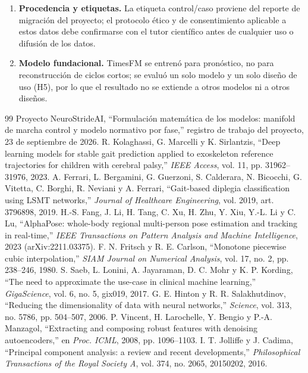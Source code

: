 \documentclass[11pt,a4paper]{article}
\begin{document}
\begin{enumerate}
\item \textbf{Procedencia y etiquetas.} La etiqueta control/caso proviene del reporte de migración del proyecto; el protocolo ético y de consentimiento aplicable a estos datos debe confirmarse con el tutor científico antes de cualquier uso o difusión de los datos.
\item \textbf{Modelo fundacional.} TimesFM se entrenó para pronóstico, no para reconstrucción de ciclos cortos; se evaluó un solo modelo y un solo diseño de uso (H5), por lo que el resultado no se extiende a otros modelos ni a otros diseños.
\end{enumerate}

\begin{thebibliography}{99}
\small
{} Proyecto NeuroStrideAI, ``Formulación matemática de los modelos: manifold de marcha control y modelo normativo por fase,'' registro de trabajo del proyecto, 23 de septiembre de 2026.
 R. Kolaghassi, G. Marcelli y K. Sirlantzis, ``Deep learning models for stable gait prediction applied to exoskeleton reference trajectories for children with cerebral palsy,'' \emph{IEEE Access}, vol. 11, pp. 31962--31976, 2023.
 A. Ferrari, L. Bergamini, G. Guerzoni, S. Calderara, N. Bicocchi, G. Vitetta, C. Borghi, R. Neviani y A. Ferrari, ``Gait-based diplegia classification using LSMT networks,'' \emph{Journal of Healthcare Engineering}, vol. 2019, art. 3796898, 2019.
 H.-S. Fang, J. Li, H. Tang, C. Xu, H. Zhu, Y. Xiu, Y.-L. Li y C. Lu, ``AlphaPose: whole-body regional multi-person pose estimation and tracking in real-time,'' \emph{IEEE Transactions on Pattern Analysis and Machine Intelligence}, 2023 (arXiv:2211.03375).
 F. N. Fritsch y R. E. Carlson, ``Monotone piecewise cubic interpolation,'' \emph{SIAM Journal on Numerical Analysis}, vol. 17, no. 2, pp. 238--246, 1980.
 S. Saeb, L. Lonini, A. Jayaraman, D. C. Mohr y K. P. Kording, ``The need to approximate the use-case in clinical machine learning,'' \emph{GigaScience}, vol. 6, no. 5, gix019, 2017.
 G. E. Hinton y R. R. Salakhutdinov, ``Reducing the dimensionality of data with neural networks,'' \emph{Science}, vol. 313, no. 5786, pp. 504--507, 2006.
 P. Vincent, H. Larochelle, Y. Bengio y P.-A. Manzagol, ``Extracting and composing robust features with denoising autoencoders,'' en \emph{Proc. ICML}, 2008, pp. 1096--1103.
 I. T. Jolliffe y J. Cadima, ``Principal component analysis: a review and recent developments,'' \emph{Philosophical Transactions of the Royal Society A}, vol. 374, no. 2065, 20150202, 2016.

\end{thebibliography}
\end{document}
